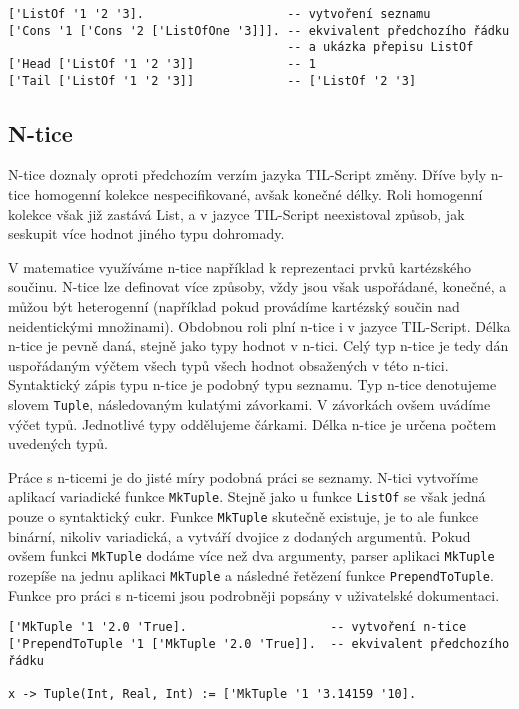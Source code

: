 \begin{lstlisting}[caption={Příklad využití seznamů}]
['ListOf '1 '2 '3].                    -- vytvoření seznamu
['Cons '1 ['Cons '2 ['ListOfOne '3]]]. -- ekvivalent předchozího řádku
                                       -- a ukázka přepisu ListOf
['Head ['ListOf '1 '2 '3]]             -- 1
['Tail ['ListOf '1 '2 '3]]             -- ['ListOf '2 '3]
\end{lstlisting}

\subsection{N-tice}

N-tice doznaly oproti předchozím verzím jazyka TIL-Script změny. Dříve byly n-tice homogenní kolekce
nespecifikované, avšak konečné délky. Roli homogenní kolekce však již zastává List, a v jazyce
TIL-Script neexistoval způsob, jak seskupit více hodnot jiného typu dohromady.

V matematice využíváme n-tice například k reprezentaci prvků kartézského součinu. N-tice lze
definovat více způsoby, vždy jsou však uspořádané, konečné, a můžou být heterogenní (například
pokud provádíme kartézský součin nad neidentickými množinami). Obdobnou roli plní n-tice i v jazyce
TIL-Script. Délka n-tice je pevně daná, stejně jako typy hodnot v n-tici. Celý typ n-tice je
tedy dán uspořádaným výčtem všech typů všech hodnot obsažených v této n-tici. Syntaktický zápis
typu n-tice je podobný typu seznamu. Typ n-tice denotujeme slovem \lstinline{Tuple}, následovaným
kulatými závorkami. V závorkách ovšem uvádíme výčet typů. Jednotlivé typy oddělujeme čárkami. Délka
n-tice je určena počtem uvedených typů.

Práce s n-ticemi je do jisté míry podobná práci se seznamy. N-tici vytvoříme aplikací variadické
funkce \lstinline{MkTuple}. Stejně jako u funkce \lstinline{ListOf} se však jedná pouze o
syntaktický cukr. Funkce \lstinline{MkTuple} skutečně existuje, je to ale funkce binární, nikoliv
variadická, a vytváří dvojice z dodaných argumentů. Pokud ovšem funkci \lstinline{MkTuple} dodáme
více než dva argumenty, parser aplikaci \lstinline{MkTuple} rozepíše na jednu aplikaci
\lstinline{MkTuple} a následné řetězení funkce \lstinline{PrependToTuple}. Funkce pro práci
s n-ticemi jsou podrobněji popsány v uživatelské dokumentaci.
 
\begin{lstlisting}[caption={Příklad využití n-tic}]
['MkTuple '1 '2.0 'True].                    -- vytvoření n-tice
['PrependToTuple '1 ['MkTuple '2.0 'True]].  -- ekvivalent předchozího řádku

x -> Tuple(Int, Real, Int) := ['MkTuple '1 '3.14159 '10].
\end{lstlisting}

